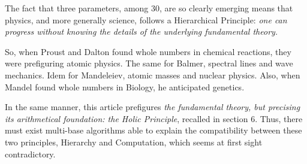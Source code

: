 \documentclass[twoside,draft]{article}
\begin{document}
\begin{sloppypar}
The fact that three parameters, among 30, are so clearly emerging means that physics, and more generally science, follows a Hierarchical Principle: \textit{one can progress without knowing the details of the underlying fundamental theory.}

So, when Proust and Dalton found whole numbers in chemical reactions, they were prefiguring atomic physics. The same for Balmer, spectral lines and wave mechanics. Idem for Mandeleiev, atomic masses and nuclear physics. Also, when Mandel found whole numbers in Biology, he anticipated genetics. 

In the same manner, this article prefigures \textit{the fundamental theory, but precising its arithmetical foundation: the Holic Principle}, recalled in section 6. Thus, there must exist multi-base algorithms able to explain the compatibility between these two principles, Hierarchy and Computation, which seems at first sight contradictory. 



\end{sloppypar}
\end{document}
